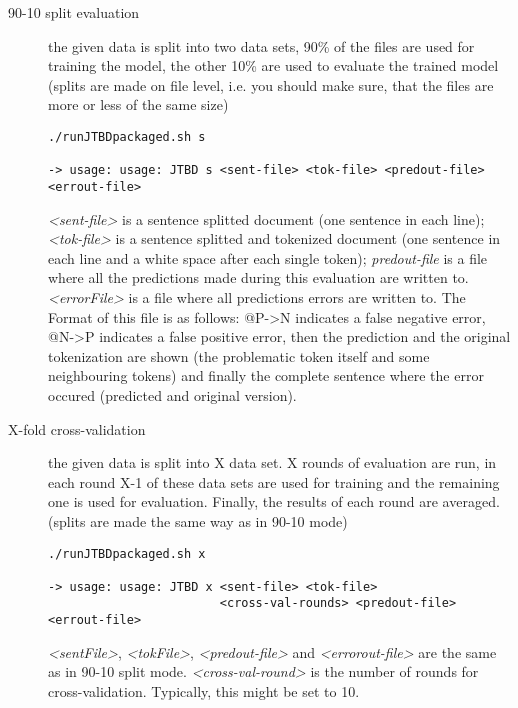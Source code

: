 \documentclass[11pt,a4paper,halfparskip]{scrartcl}
\begin{document}
\begin{description}
\item [90-10 split evaluation] the given data is split into two data
  sets, 90\% of the files are used for training the model, the other
  10\% are used to evaluate the trained model (splits are made on file
  level, i.e. you should make sure, that the files are more or less of
  the same size)

\begin{verbatim}
./runJTBDpackaged.sh s

-> usage: usage: JTBD s <sent-file> <tok-file> <predout-file> <errout-file>
\end{verbatim}

  \textit{<sent-file>} is a sentence splitted document (one sentence
  in each line); \textit{<tok-file>} is a sentence splitted and
  tokenized document (one sentence in each line and a white space
  after each single token); \textit{predout-file} is a file where all
  the predictions made during this evaluation are written to.
  \textit{<errorFile>} is a file where all predictions errors are
  written to. The Format of this file is as follows: @P->N indicates a
  false negative error, @N->P indicates a false positive error, then
  the prediction and the original tokenization are shown (the
  problematic token itself and some neighbouring tokens) and finally
  the complete sentence where the error occured (predicted and
  original version).


\item[X-fold cross-validation] the given data is split into X data
  set. X rounds of evaluation are run, in each round X-1 of these data
  sets are used for training and the remaining one is used for
  evaluation. Finally, the results of each round are averaged. (splits
  are made the same way as in 90-10 mode)

\begin{verbatim}
./runJTBDpackaged.sh x

-> usage: usage: JTBD x <sent-file> <tok-file> 
                        <cross-val-rounds> <predout-file> <errout-file>
\end{verbatim}

  \textit{<sentFile>}, \textit{<tokFile>}, \textit{<predout-file>} and
  \textit{<errorout-file>} are the same as in 90-10 split mode.
  \textit{<cross-val-round>} is the number of rounds for
  cross-validation. Typically, this might be set to 10.

\end{description}
\end{document}
